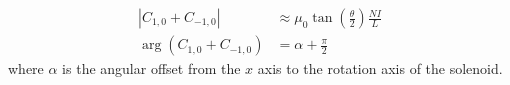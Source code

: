 \begin{align}
    |C_{1,0} + C_{-1,0}|     & \approx \mu_0
    \tan\left( \frac{\theta}{2} \right) \frac{NI}{L}    
    \label{eq:C10-est}
    \\
    \arg(C_{1,0} + C_{-1,0}) & = \alpha + \frac{\pi}{2}
    \label{eq:C10-alpha}
\end{align}
where $\alpha$ is the angular offset from the $x$ axis to the rotation
axis of the solenoid.
